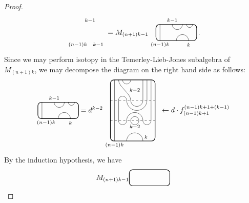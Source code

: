 \documentclass[11pt]{article}
\theoremstyle{plain}
\theoremstyle{definition}
\newcommand{\dave}[1]{\marginpar{\tiny \textcolor{orange}{DP: #1}}}
\begin{document}
\begin{proof}
\begin{align*}
\begin{tikzpicture}[baseline = .3cm]
	\node at (.6,1) {\scriptsize{$k{-}1$}};
	\node at (1,-.2) {\scriptsize{$k{-}1$}};
	\node at (0,-.2) {\scriptsize{$(n{-}1)k$}};
\end{tikzpicture}
=
M_{(n+1)k-1} 
\begin{tikzpicture}[baseline = .3cm]
	\draw[thick, rounded corners = 5pt] (0,0) rectangle (2,.8);
	\draw (.2,0) -- (.2,.8);
	\draw (.8,.8) arc (-180:0:.25cm);
	\draw (1.5,.8) arc (-180:0:.15cm);
	\draw (1,0) arc (180:0:.3cm);
	\node at (.8,1) {\scriptsize{$k{-}1$}};
	\node at (1.6,-.2) {\scriptsize{$k$}};
	\node at (.2,-.2) {\scriptsize{$(n{-}1)k$}};
\end{tikzpicture}
\,.
\end{align*}
Since we may perform isotopy in the Temerley-Lieb-Jones subalgebra of $M_{(n+1)k}$, we may decompose the diagram on the right hand side as follows:
$$
\begin{tikzpicture}[baseline = .3cm]
	\draw[thick, rounded corners = 5pt] (0,0) rectangle (2,.8);
	\draw (.2,0) -- (.2,.8);
	\draw (.8,.8) arc (-180:0:.25cm);
	\draw (1.5,.8) arc (-180:0:.15cm);
	\draw (1,0) arc (180:0:.3cm);
	\node at (.8,1) {\scriptsize{$k{-}1$}};
	\node at (1.6,-.2) {\scriptsize{$k$}};
	\node at (.4,-.2) {\scriptsize{$(n{-}1)k$}};
\end{tikzpicture}
=
d^{k-2}
\begin{tikzpicture}[baseline = 1.4cm]
	\draw[thick, rounded corners = 5pt] (0,0) rectangle (2.2,3);
	\draw (.2,0) -- (.2,3);
	\draw (.6,3) arc (-180:0:.2cm);
	\draw (.4,3) .. controls ++(270:.35cm) and ++(90:.35cm) .. (1,2) arc (-180:0:.3cm) -- (1.6,3);
	\draw (1.8,3) -- (1.8,2) arc (0:-180:.5cm) arc (0:180:.2cm) -- (.4,1) arc (-180:0:.2cm) arc (180:0:.4cm) arc (-180:0:.2cm) -- (2,3);
	\draw (1.2,1) circle (.2cm);
	\draw (.8,0) arc (180:0:.4cm);
	\draw[dashed] (0,1) -- (2.2,1);
	\draw[dashed] (0,2) -- (2.2,2);
	\node at (1.2,.7) {\scriptsize{$k{-}2$}};
	\node at (1.2,2.5) {\scriptsize{$k{-}2$}};
	\node at (1.75,.2) {\scriptsize{$k$}};
	\node at (.2,-.2) {\scriptsize{$(n{-}1)k$}};
%
	\node at (4.2,1.5) {$\leftarrow d\cdot f^{(n-1)k+1+(k-1)}_{(n-1)k+1}$};
\end{tikzpicture}
$$
By the induction hypothesis, we have
$$
M_{(n+1)k-1}
\begin{tikzpicture}[baseline = .3cm]
	\draw[thick, rounded corners = 5pt] (0,0) rectangle (2,.8);

\end{tikzpicture}$$
\end{proof}
\end{document}
